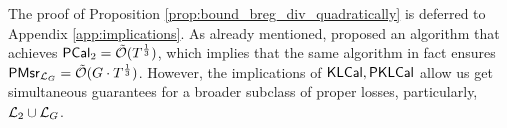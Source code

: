 The proof of Proposition \ref{prop:bound_breg_div_quadratically} is deferred to Appendix \ref{app:implications}. As already mentioned, \cite{fishelsonfull} proposed an algorithm that achieves $\mathsf{PCal}_{2} = \tilde{\mathcal{O}}(T^{\frac{1}{3}})$, which implies that the same algorithm in fact ensures $\mathsf{PMsr}_{\mathcal{L}_{G}} = \tilde{\mathcal{O}}(G \cdot T^{\frac{1}{3}})$. However, the implications of $\mathsf{KLCal}, \mathsf{PKLCal}$ allow us get simultaneous guarantees for a broader subclass of proper losses, particularly, $\mathcal{L}_{2} \cup \mathcal{L}_{G}$.


